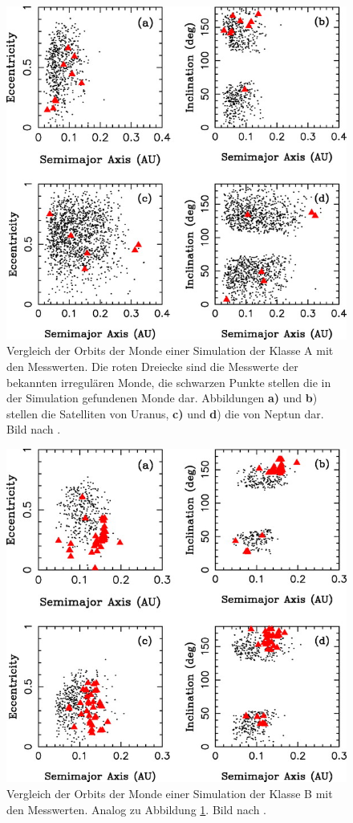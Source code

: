 \documentclass[12pt,a4paper,twoside]{article}
\renewcommand{\cite}{\citep}
\begin{document}
\begin{figure}[tbn]
\centering
\includegraphics[scale=2]{img/Nesvorny2007-5.jpg}
\caption{Vergleich der Orbits der Monde einer Simulation der Klasse A mit den Messwerten. Die roten Dreiecke sind die Messwerte der bekannten irregulären Monde, die schwarzen Punkte stellen die in der Simulation gefundenen Monde dar. Abbildungen \textbf{a)} und \textbf{b}) stellen die Satelliten von Uranus, \textbf{c)} und \textbf{d}) die von Neptun dar. Bild nach \cite{Nesvorny2007}.}
\label{fig:KlasseA_Mondorbitale}
\end{figure}
\begin{figure}[tbn]
\centering
\includegraphics[scale=2]{img/Nesvorny2007-7.jpg}
\caption{Vergleich der Orbits der Monde einer Simulation der Klasse B mit den Messwerten. Analog zu Abbildung \ref{fig:KlasseA_Mondorbitale}. Bild nach \cite{Nesvorny2007}.}
\label{fig:KlasseB_Mondorbitale}
\end{figure}
\end{document}
